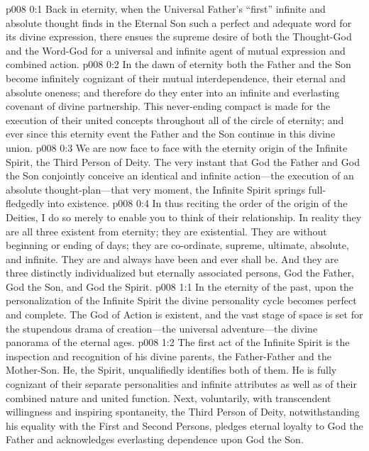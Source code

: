 \author{Divine Counselor}
\vs p008 0:1 Back in eternity, when the Universal Father’s “first” infinite and absolute thought finds in the Eternal Son such a perfect and adequate word for its divine expression, there ensues the supreme desire of both the Thought\hyp{}God and the Word\hyp{}God for a universal and infinite agent of mutual expression and combined action.
\vs p008 0:2 In the dawn of eternity both the Father and the Son become infinitely cognizant of their mutual interdependence, their eternal and absolute oneness; and therefore do they enter into an infinite and everlasting covenant of divine partnership. This never\hyp{}ending compact is made for the execution of their united concepts throughout all of the circle of eternity; and ever since this eternity event the Father and the Son continue in this divine union.
\vs p008 0:3 We are now face to face with the eternity origin of the Infinite Spirit, the Third Person of Deity. The very instant that God the Father and God the Son conjointly conceive an identical and infinite action---the execution of an absolute thought\hyp{}plan---that very moment, the Infinite Spirit springs full\hyp{}fledgedly into existence.
\pc \vs p008 0:4 In thus reciting the order of the origin of the Deities, I do so merely to enable you to think of their relationship. In reality they are all three existent from eternity; they are existential. They are without beginning or ending of days; they are co\hyp{}ordinate, supreme, ultimate, absolute, and infinite. They are and always have been and ever shall be. And they are three distinctly individualized but eternally associated persons, God the Father, God the Son, and God the Spirit.
\vs p008 1:1 In the eternity of the past, upon the personalization of the Infinite Spirit the divine personality cycle becomes perfect and complete. The God of Action is existent, and the vast stage of space is set for the stupendous drama of creation---the universal adventure---the divine panorama of the eternal ages.
\vs p008 1:2 The first act of the Infinite Spirit is the inspection and recognition of his divine parents, the Father\hyp{}Father and the Mother\hyp{}Son. He, the Spirit, unqualifiedly identifies both of them. He is fully cognizant of their separate personalities and infinite attributes as well as of their combined nature and united function. Next, voluntarily, with transcendent willingness and inspiring spontaneity, the Third Person of Deity, notwithstanding his equality with the First and Second Persons, pledges eternal loyalty to God the Father and acknowledges everlasting dependence upon God the Son.

